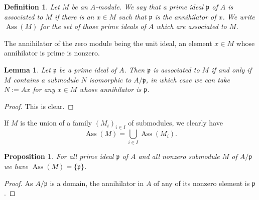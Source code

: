 \documentclass[parskip=half,fontsize=12pt]{scrartcl}%
\newcommand{\oo}{\operatorname}\newcommand{\ooo}{\operatorname*}
\newcommand{\mf}{\mathfrak}
\newcommand{\ppp}{\mf p}
\newcommand{\Ass}{\oo{Ass}}
\newtheorem{df}[thm]{Definition}
\newtheorem{lem}[thm]{Lemma}
\newtheorem{prop}[thm]{Proposition}
\begin{document}

\begin{df}
Let $M$ be an $A$-module. We say that a prime ideal $\ppp$ of $A$ is \emph{associated} to $M$ if there is an $x\in M$ such that  $\ppp$ is the annihilator of $x$. We write $\Ass(M)$ for the set of those prime ideals of $A$ which are associated to $M$. 
\end{df}

The annihilator of the zero module being the unit ideal, an element $x\in M$ whose annihilator is prime is nonzero. 

\begin{lem}\label{ail0}
Let $\ppp$ be a prime ideal of $A$. Then $\ppp$ is associated to $M$ if and only if $M$ contains a submodule $N$ isomorphic to $A/\ppp$, in which case we can take $N:=Ax$ for any $x\in M$ whose annihilator is $\ppp$. 
\end{lem}
\begin{proof}
This is clear.
\end{proof}

If $M$ is the union of a family $(M_i)_{i\in I}$ of submodules, we clearly have
\begin{equation}\label{ai1}
\Ass(M)=\bigcup_{i\in I}\Ass(M_i).
\end{equation}

\begin{prop}\label{aip1}
For all prime ideal $\ppp$ of $A$ and all nonzero submodule $M$ of $A/\ppp$ we have $\Ass(M)=\{\ppp\}$. 
\end{prop}
\begin{proof}
As $A/\ppp$ is a domain, the annihilator in $A$ of any of its nonzero element is $\ppp$.
\end{proof}
\end{document}
